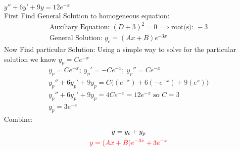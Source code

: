 \item [6.] $y''+6y'+9y=12e^{-x}$\\[2mm]
First Find General Solution to homogeneous equation:
\begin{gather*}
    \text{Auxiliary Equation: } (D+3)^2=0 \implies \text{root(s): } -3\\
    \text{General Solution: } y_c=(Ax+B)e^{-3x}
\end{gather*}
Now Find particular Solution:
Using a simple way to solve for the particular solution we know $y_p=Ce^{-x}$
\begin{gather*}
    y_p=Ce^{-x};\:y_p'=-Ce^{-x};\:y_p''=Ce^{-x}\\
    y_p''+6y_p'+9y_p=C\big((e^{-x})+6(-e^{-x})+9(e^{x})\big)\\
    y_p''+6y_p'+9y_p=4Ce^{-x} = 12e^{-x} \text{ so } C=3\\
    y_p = 3e^{-x}
\end{gather*}
Combine:
\begin{gather*}
    y=y_c+y_p\\
    \textcolor{red}{y = (Ax+B)e^{-3x}+3e^{-x}}
\end{gather*}